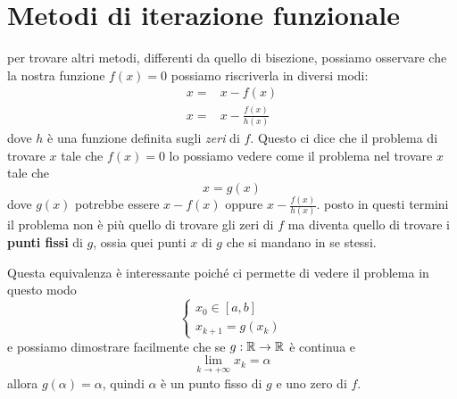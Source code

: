 \section{Metodi di iterazione funzionale}
per trovare altri metodi, differenti da quello di bisezione, possiamo osservare che la nostra funzione
$f(x) = 0$ possiamo riscriverla in diversi modi:
\begin{align*}
	x = & x - f(x)              \\
	x = & x - \frac{f(x)}{h(x)}
\end{align*}
dove $h$ è una funzione definita sugli \emph{zeri} di $f$. Questo ci dice che il problema di trovare $x$ tale
che $f(x) = 0$ lo possiamo vedere come il problema nel trovare $x$ tale che
\[ x = g(x) \]
dove $g(x)$ potrebbe essere $x - f(x)$ oppure $x - \frac{f(x)}{h(x)}$. posto in questi termini il problema non
è più quello di trovare gli zeri di $f$ ma diventa quello di trovare i \textbf{punti fissi} di $g$, ossia quei
punti $x$ di $g$ che si mandano in se stessi.

Questa equivalenza è interessante poiché ci permette di vedere il problema in questo modo
\[
	\begin{cases}
		x_0 \in [a, b] \\
		x_{k+1} = g(x_k)
	\end{cases}
\]
e possiamo dimostrare facilmente che se $g : \mathbb{R} \to \mathbb{R}$ è continua e
\[ \lim_{k \to +\infty} x_{k} = \alpha \]
allora $g(\alpha) = \alpha$, quindi $\alpha$ è un punto fisso di $g$ e uno zero di $f$.

